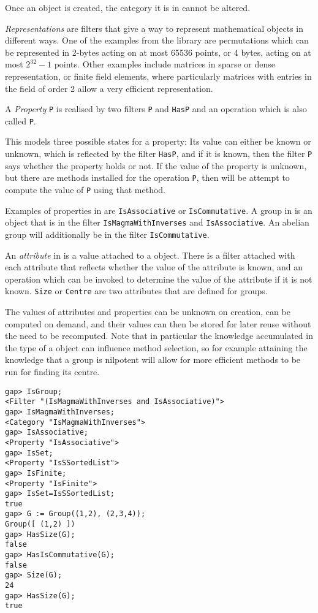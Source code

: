 Once an object is created, the category it is in cannot be altered.

\emph{Representations} are filters that give a way to represent mathematical
objects in different ways. One of the examples from the \GAP library are permutations
which can be represented in 2-bytes acting on at most 65536 points, or 4 bytes, acting
on at most $2^{32}-1$ points. Other examples include matrices in sparse or dense
representation, or finite field elements, where particularly matrices with entries in
the field of order 2 allow a very efficient representation.

A \emph{Property} \texttt{P} is realised by two filters \texttt{P} and \texttt{HasP} and an
operation which is also called \texttt{P}.

This models three possible states for a property: Its value can either be known or unknown,
which is reflected by the filter \texttt{HasP}, and if it is known, then the filter \texttt{P}
says whether the property holds or not.
If the value of the property is unknown, but there are methods installed for the operation
\texttt{P}, then \GAP will be attempt to compute the value of \texttt{P} using that method.

Examples of properties in \GAP are \texttt{IsAssociative}
or \texttt{IsCommutative}. A group in \GAP is an object that is in the filter
\texttt{IsMagmaWithInverses} and \texttt{IsAssociative}. An abelian group will additionally
be in the filter \texttt{IsCommutative}.

An \emph{attribute} in \GAP is a value attached to a \GAP object. There is
a filter attached with each attribute that reflects whether the value
of the attribute is known, and an operation which can be invoked to determine
the value of the attribute if it is not known.
\texttt{Size} or \texttt{Centre} are two attributes that are defined for groups.

The values of attributes and properties can be unknown on creation,
can be computed on demand, and their values can then be stored for later
reuse without the need to be recomputed. Note that in particular the knowledge
accumulated in the type of a \GAP object can influence method selection, so for
example attaining the knowledge that a group is nilpotent will allow for more
efficient methods to be run for finding its centre.

\begin{lstlisting}
gap> IsGroup;
<Filter "(IsMagmaWithInverses and IsAssociative)">
gap> IsMagmaWithInverses;
<Category "IsMagmaWithInverses">
gap> IsAssociative;
<Property "IsAssociative">
gap> IsSet;
<Property "IsSSortedList">
gap> IsFinite;
<Property "IsFinite">
gap> IsSet=IsSSortedList;
true
gap> G := Group((1,2), (2,3,4));
Group([ (1,2) ])
gap> HasSize(G);
false
gap> HasIsCommutative(G);
false
gap> Size(G);
24
gap> HasSize(G);
true
\end{lstlisting}

